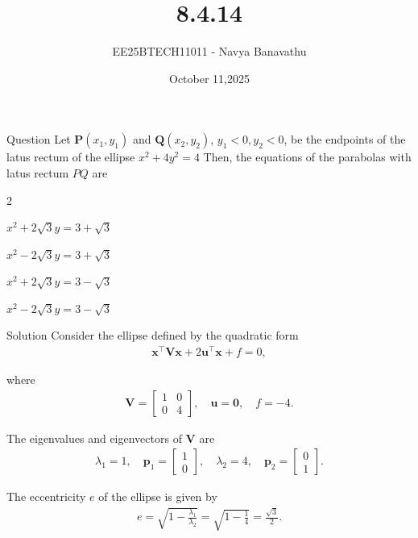 \documentclass{beamer}
\title{8.4.14}
\date{October 11,2025}
\author{EE25BTECH11011 - Navya Banavathu}
\begin{document}
\frame{\titlepage}

\begin{frame}{Question}
Let $\mathbf{P}(x_1, y_1) $ and $\mathbf{Q}(x_2, y_2)$, $ y_1 < 0, y_2 < 0 $, be the endpoints of the latus rectum of the ellipse $x^2 + 4y^2 = 4$
Then, the equations of the parabolas with latus rectum $PQ$ are
\begin{enumerate}
\begin{multicols}{2}

    \item $ x^2 + 2\sqrt{3}y = 3 + \sqrt{3} $
    \item $ x^2 - 2\sqrt{3}y = 3 + \sqrt{3} $
    \item $ x^2 + 2\sqrt{3}y = 3 - \sqrt{3} $
    \item $ x^2 - 2\sqrt{3}y = 3 - \sqrt{3} $
\end{multicols}
\end{enumerate}
\end{frame}

\begin{frame}{Solution}
Consider the ellipse defined by the quadratic form
\begin{align}
\mathbf{x}^\top \mathbf{V} \mathbf{x} + 2 \mathbf{u}^\top \mathbf{x} + f = 0,
\end{align}

where
\begin{align}
\mathbf{V} = \begin{bmatrix} 1 & 0 \\ 0 & 4 \end{bmatrix}, \quad
\mathbf{u} = \mathbf{0}, \quad
f = -4.
\end{align}

The eigenvalues and eigenvectors of $\mathbf{V}$ are
\begin{align}
\lambda_1 = 1, \quad \mathbf{p}_1 = \begin{bmatrix} 1 \\ 0 \end{bmatrix}, \quad
\lambda_2 = 4, \quad \mathbf{p}_2 = \begin{bmatrix} 0 \\ 1 \end{bmatrix}.
\end{align}

The eccentricity $e$ of the ellipse is given by
\begin{align}
e = \sqrt{1 - \frac{\lambda_1}{\lambda_2}} = \sqrt{1 - \frac{1}{4}} = \frac{\sqrt{3}}{2}.
\end{align}
\end{frame}
\end{document}
